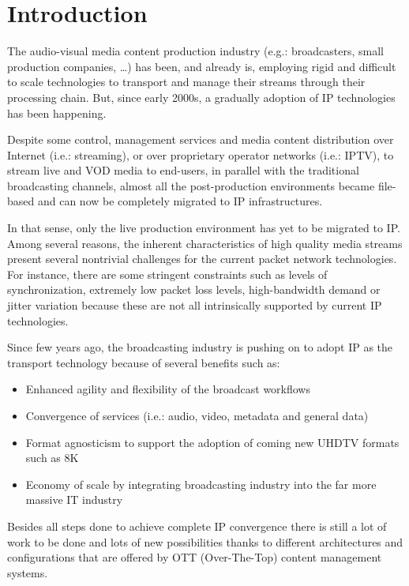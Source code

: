 \cleardoublepage
{}
\chapter*{Introduction}

The audio-visual media content production industry (e.g.: broadcasters, small production companies, \ldots) has been, and already is, employing rigid and difficult to scale technologies to transport and manage their streams through their processing chain. But, since early 2000s, a gradually adoption of IP technologies has been happening.

Despite some control, management services and media content distribution over Internet (i.e.: streaming), or over proprietary operator networks (i.e.: IPTV), to stream live and VOD media to end-users, in parallel with the traditional broadcasting channels, almost all the post-production environments became file-based and can now be completely migrated to IP infrastructures. 

In that sense, only the live production environment has yet to be migrated to IP. Among several reasons, the inherent characteristics of high quality media streams present several nontrivial challenges for the current packet network technologies. For instance, there are some stringent constraints such as levels of synchronization, extremely low packet loss levels, high-bandwidth demand or jitter variation because these are not all intrinsically supported by current IP technologies.

Since few years ago, the broadcasting industry is pushing on to adopt IP as the transport technology because of several benefits such as:

\begin{itemize}
  \item Enhanced agility and flexibility of the broadcast workflows
  \item Convergence of services (i.e.: audio, video, metadata and general data)
  \item Format agnosticism to support the adoption of coming new UHDTV formats such as 8K 
  \item Economy of scale by integrating broadcasting industry into the far more massive IT industry
\end{itemize}

Besides all steps done to achieve complete IP convergence there is still a lot of work to be done and lots of new possibilities thanks to different architectures and configurations that are offered by OTT (Over-The-Top) content management systems. 

